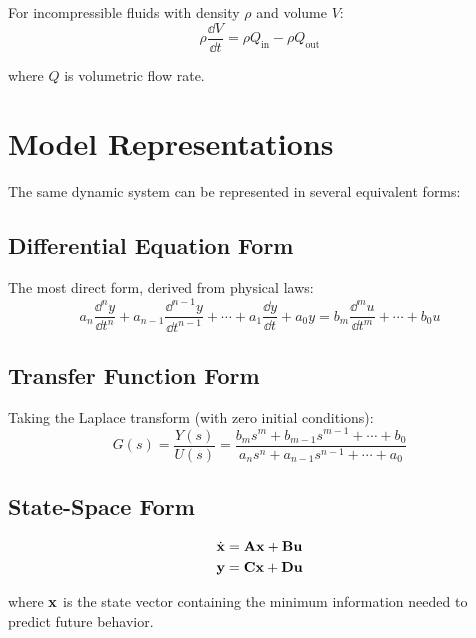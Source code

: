 For incompressible fluids with density $\rho$ and volume $V$:
\begin{equation}
\rho\frac{\dd V}{\dd t} = \rho Q_{\text{in}} - \rho Q_{\text{out}}
\end{equation}

where $Q$ is volumetric flow rate.

\section{Model Representations}
\label{sec:model_representations}

The same dynamic system can be represented in several equivalent forms:

\subsection{Differential Equation Form}

The most direct form, derived from physical laws:
\begin{equation}
a_n\frac{\dd^n y}{\dd t^n} + a_{n-1}\frac{\dd^{n-1} y}{\dd t^{n-1}} + \cdots + a_1\frac{\dd y}{\dd t} + a_0 y = b_m\frac{\dd^m u}{\dd t^m} + \cdots + b_0 u
\end{equation}

\subsection{Transfer Function Form}

Taking the Laplace transform (with zero initial conditions):
\begin{equation}
G(s) = \frac{Y(s)}{U(s)} = \frac{b_m s^m + b_{m-1}s^{m-1} + \cdots + b_0}{a_n s^n + a_{n-1}s^{n-1} + \cdots + a_0}
\end{equation}

\subsection{State-Space Form}

\begin{align}
\dot{\mathbf{x}} &= \mathbf{A}\mathbf{x} + \mathbf{B}\mathbf{u} \\
\mathbf{y} &= \mathbf{C}\mathbf{x} + \mathbf{D}\mathbf{u}
\end{align}

where $\mathbf{x}$ is the state vector containing the minimum information needed to predict future behavior.

